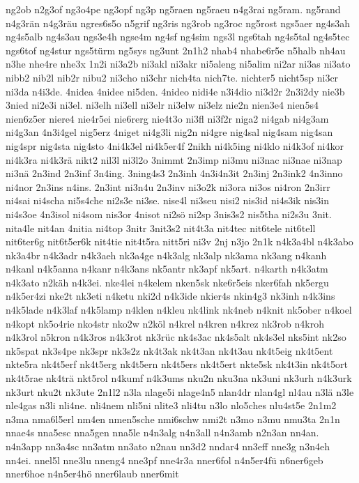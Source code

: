 {ng2ob
n2g3of
ng3o4pe
ng3opf
ng3p
ng5raen
ng5raeu
n4g3rai
ng5ram.
ng5rand
n4g3rän
n4g3räu
ngres6s5o
n5grif
ng3ris
ng3rob
ng3roc
ng5rost
ngs5aer
ng4s3ah
ng4s5alb
ng4s3au
ngs3e4h
ngse4m
ng4sf
ng4sim
ngs3l
ngs6tah
ng4s5tal
ng4s5tec
ngs6tof
ng4stur
ngs5türm
ng5sys
ng3unt
2n1h2
nhab4
nhabe6r5e
n5halb
nh4au
n3he
nhe4re
nhe3x
1n2i
ni3a2b
ni3akl
ni3akr
ni5aleng
ni5alim
ni2ar
ni3as
ni3ato
nibb2
nib2l
nib2r
nibu2
ni3cho
ni3chr
nich4ta
nich7te.
nichter5
nicht5sp
ni3cr
ni3da
n4i3de.
4nidea
4nidee
ni5den.
4nideo
nidi4e
n3i4dio
ni3d2r
2n3i2dy
nie3b
3nied
ni2e3i
ni3el.
ni3elh
ni3ell
ni3elr
ni3elw
ni3elz
nie2n
nien3e4
nien5s4
nien6z5er
niere4
nie4r5ei
nie6rerg
nie4t3o
ni3fl
ni3f2r
niga2
ni4gab
ni4g3am
ni4g3an
4n3i4gel
nig5erz
4niget
ni4g3li
nig2n
ni4gre
nig4sal
nig4sam
nig4san
nig4spr
nig4sta
nig4sto
4ni4k3el
ni4k5er4f
2nikh
ni4k5ing
ni4klo
ni4k3of
ni4kor
ni4k3ra
ni4k3rä
nikt2
nil3l
ni3l2o
3nimmt
2n3imp
ni3mu
ni3nac
ni3nae
ni3nap
ni3nä
2n3ind
2n3inf
3n4ing.
3ning4s3
2n3inh
4n3i4n3it
2n3inj
2n3ink2
4n3inno
ni4nor
2n3ins
n4ins.
2n3int
ni3n4u
2n3inv
ni3o2k
ni3ora
ni3os
ni4ron
2n3irr
ni4sai
ni4scha
ni5s4che
ni2s3e
ni3se.
nise4l
ni3seu
nisi2
nis3id
ni4s3ik
nis3in
ni4s3oe
4n3isol
ni4som
nis3or
4nisot
ni2sö
ni2sp
3nis3s2
nis5tha
ni2s3u
3nit.
nita4le
nit4an
4nitia
ni4top
3nitr
3nit3s2
nit4t3a
nit4tec
nit6tele
nit6tell
nit6ter6g
nit6t5er6k
nit4tie
nit4t5ra
nitt5ri
ni3v
2nj
n3jo
2n1k
n4k3a4bl
n4k3abo
nk3a4br
n4k3adr
n4k3aeh
nk3a4ge
n4k3alg
nk3alp
nk3ama
nk3ang
n4kanh
n4kanl
n4k5anna
n4kanr
n4k3ans
nk5antr
nk3apf
nk5art.
n4karth
n4k3atm
n4k3ato
n2käh
n4k3ei.
nke4lei
n4kelem
nken5sk
nke6r5eis
nker6fah
nk5ergu
n4k5er4zi
nke2t
nk3eti
n4ketu
nki2d
n4k3ide
nkier4s
nkin4g3
nk3inh
n4k3ins
n4k5lade
n4k3laf
n4k5lamp
n4klen
n4kleu
nk4link
nk4neb
n4knit
nk5ober
n4koel
n4kopt
nk5o4rie
nko4str
nko2w
n2köl
n4krel
n4kren
n4krez
nk3rob
n4kroh
n4k3rol
n5kron
n4k3ros
n4k3rot
nk3rüc
nk4s3ac
nk4s5alt
nk4s3el
nks5int
nk2so
nk5spat
nk3s4pe
nk3spr
nk3s2z
nk4t3ak
nk4t3an
nk4t3au
nk4t5eig
nk4t5ent
nkte5ra
nk4t5erf
nk4t5erg
nk4t5ern
nk4t5ers
nk4t5ert
nkte5sk
nk4t3in
nk4t5ort
nk4t5rae
nk4trä
nkt5rol
n4kumf
n4k3ums
nku2n
nku3na
nk3uni
nk3urh
n4k3urk
nk3urt
nku2t
nk3ute
2n1l2
n3la
nlage5i
nlage4n5
nlan4dr
nlan4gl
nl4au
n3lä
n3le
nle4gas
n3li
nli4ne.
nli4nem
nli5ni
nlite3
nli4tu
n3lo
nlo5ches
nlu4st5e
2n1m2
n3ma
nma6l5erl
nm4en
nmen5sche
nmi6schw
nmi2t
n3mo
n3mu
nmu3ta
2n1n
nnae4s
nna5esc
nna5gen
nna5le
n4n3alg
n4n3all
n4n3amb
n2n3an
nn4an.
n4n3app
nn3a4sc
nn3atm
nn3ato
n2nau
nn3d2
nndar4
nn3eff
nne3g
n3n4eh
nn4ei.
nnel5l
nne3lu
nneng4
nne3pf
nne4r3a
nner6fol
n4n5er4fü
n6ner6geb
nner6hoe
n4n5er4hö
nner6laub
nner6mit
}
